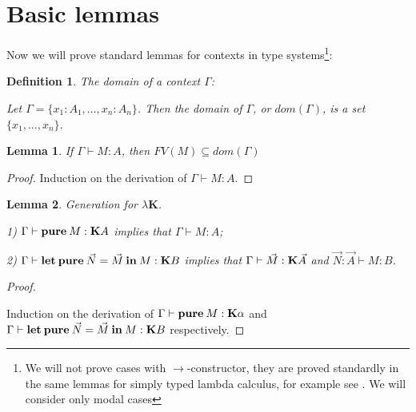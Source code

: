 \documentclass[a4paper]{article}
\newtheorem{lemma}{Lemma}
\newtheorem{defin}{Definition}
\begin{document}
  \section{Basic lemmas}

  Now we will prove standard lemmas for contexts in type systems\footnote{We will not prove cases with
  $\to$-constructor, they are proved standardly in the same lemmas for simply typed lambda calculus, for
  example see \cite{Neder}\cite{Morten}\cite{Girard}. We will consider only modal cases}:

  \begin{defin} The domain of a context $\Gamma$:

  Let $\Gamma = \{ x_1 : A_1, ..., x_n : A_n \}$. Then the domain of $\Gamma$, or $dom(\Gamma)$, is a set $\{  x_1, ..., x_n\}$.

  \end{defin}

  \begin{lemma}

  If $\Gamma \vdash M : A$, then $FV(M) \subseteq dom(\Gamma)$

  \end{lemma}

  \begin{proof}

  Induction on the derivation of $\Gamma \vdash M : A$.

  \end{proof}

  \vspace{\baselineskip}

  \begin{lemma} Generation for $\lambda \textbf{K}$.

  1) $\Gamma \vdash {\bf pure \: } M : \textbf{K}A$ implies that $\Gamma \vdash M : A$;

  2) $\Gamma \vdash {\bf let \: pure} \: \vec{N} = \vec{M} \: {\bf in} \: M : {\bf K} B$ implies that $\Gamma \vdash \vec{M} : {\bf K} \vec{A}$ and
$\vec{N} : \vec{A} \vdash M : B$.
  \end{lemma}

  \begin{proof}

  $ $

Induction on the derivation of $\Gamma \vdash {\bf pure \: } M : \textbf{K}\alpha$ and $\Gamma \vdash {\bf let \: pure} \: \vec{N} = \vec{M} \: {\bf in} \: M : {\bf K} B$ respectively.
  \end{proof}
\end{document}
